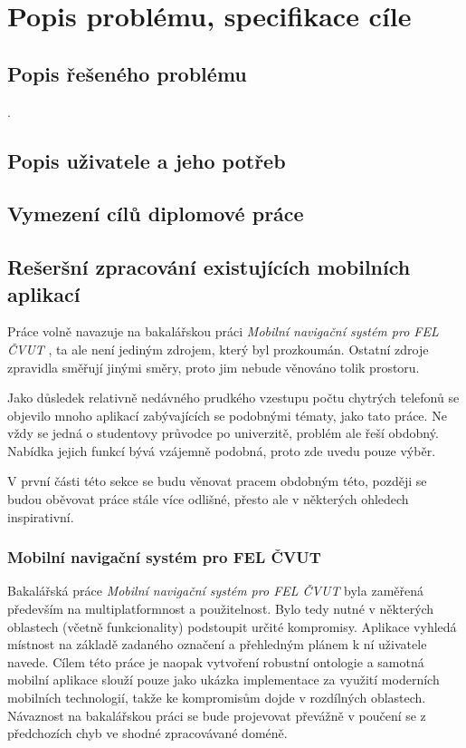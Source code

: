 \chapter{Popis problému, specifikace cíle}
\section{Popis řešeného problému}
.

\section{Popis uživatele a jeho potřeb}

\section{Vymezení cílů diplomové práce}


\section{Rešeršní zpracování existujících mobilních aplikací}
Práce volně navazuje na bakalářskou práci \textit{Mobilní navigační systém pro FEL ČVUT} \cite{Bakalarka}, ta ale není jediným zdrojem, který byl prozkoumán. Ostatní zdroje zpravidla směřují jinými směry, proto jim nebude věnováno tolik prostoru.

Jako důsledek relativně nedávného prudkého vzestupu počtu chytrých telefonů se objevilo mnoho aplikací zabývajících se podobnými tématy, jako tato práce. Ne vždy se jedná o studentovy průvodce po univerzitě, problém ale řeší obdobný. Nabídka jejich funkcí bývá vzájemně podobná, proto zde uvedu pouze výběr.

V první části této sekce se budu věnovat pracem obdobným této, později se budou oběvovat práce stále více odlišné, přesto ale v některých ohledech inspirativní.

\subsection{Mobilní navigační systém pro FEL ČVUT}
Bakalářská práce \emph{Mobilní navigační systém pro FEL ČVUT} \cite{Bakalarka} byla zaměřená především na multiplatformnost a použitelnost. Bylo tedy nutné v některých oblastech (včetně funkcionality) podstoupit určité kompromisy. Aplikace vyhledá místnost na základě zadaného označení a přehledným plánem k ní uživatele navede. Cílem této práce je naopak vytvoření robustní ontologie a samotná mobilní aplikace slouží pouze jako ukázka implementace za využití moderních mobilních technologií, takže ke kompromisům dojde v rozdílných oblastech. Návaznost na bakalářskou práci se bude projevovat převážně v poučení se z předchozích chyb ve shodné zpracovávané doméně.

